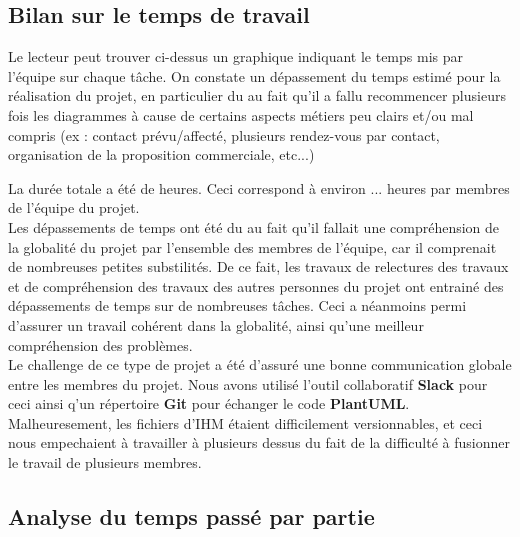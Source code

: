 \subsection*{Bilan sur le temps de travail}
  \begin{figure}[H]
    
  \end{figure}
  
Le lecteur peut trouver ci-dessus un graphique indiquant le temps mis par l'équipe sur chaque tâche.
On constate un dépassement du temps estimé pour la réalisation du projet, en particulier du au fait qu'il a fallu recommencer plusieurs fois les diagrammes à cause de certains aspects métiers peu clairs et/ou mal compris (ex : contact prévu/affecté, plusieurs rendez-vous par contact, organisation de la proposition commerciale, etc...)


La durée totale a été de  heures. Ceci correspond à environ ... heures par membres de l'équipe du projet.\\

Les dépassements de temps ont été du au fait qu'il fallait une compréhension de la globalité du projet par l'ensemble des membres de l'équipe, car il comprenait de nombreuses petites substilités. De ce fait, les travaux de relectures des travaux et de compréhension des travaux des autres personnes du projet ont entrainé des dépassements de temps sur de nombreuses tâches. Ceci a néanmoins permi d'assurer un travail cohérent dans la globalité, ainsi qu'une meilleur compréhension des problèmes.\\

Le challenge de ce type de projet a été d'assuré une bonne communication globale entre les membres du projet. Nous avons utilisé l'outil collaboratif \textbf{Slack} pour ceci ainsi q'un répertoire \textbf{Git} pour échanger le code \textbf{PlantUML}. Malheuresement, les fichiers d'IHM étaient difficilement versionnables, et ceci nous empechaient à travailler à plusieurs dessus du fait de la difficulté à fusionner le travail de plusieurs membres.

\subsection*{Analyse du temps passé par partie}



